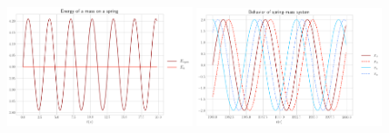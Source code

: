 \documentclass[10pt]{article}
\begin{document}
\begin{figure}
\includegraphics[width=0.48\textwidth]{A323_comp.png}
\includegraphics[width=0.48\textwidth]{A324.png}
\end{figure}
\end{document}
